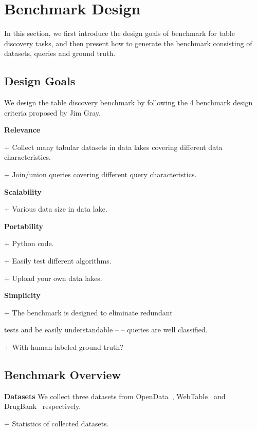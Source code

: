 \section{Benchmark Design} 
In this section, we first introduce the design goals of \sys benchmark for table discovery tasks, and then present how to generate the \sys benchmark consisting of datasets, queries and ground truth.

\subsection{Design Goals}
We design the table discovery benchmark by following the 4
benchmark design criteria proposed by Jim Gray.

\noindent\textbf{Relevance}

+ Collect many tabular datasets in data lakes covering different data characteristics.

+ Join/union queries covering different query characteristics.


\noindent\textbf{Scalability}

+ Various data size in data lake.

\noindent\textbf{Portability}

+ Python code.

+ Easily test different algorithms.

+ Upload your own data lakes.

\noindent\textbf{Simplicity}

+ The benchmark is designed to eliminate redundant

tests and be easily understandable -- -- queries are well classified.

+ With human-labeled ground truth?








\subsection{Benchmark Overview}


\noindent\textbf{Datasets}
We collect three datasets from OpenData~\cite{OpenData}, WebTable~\cite{WebTable} and DrugBank~\cite{DrugCentral} respectively. 


+ Statistics of collected datasets.


